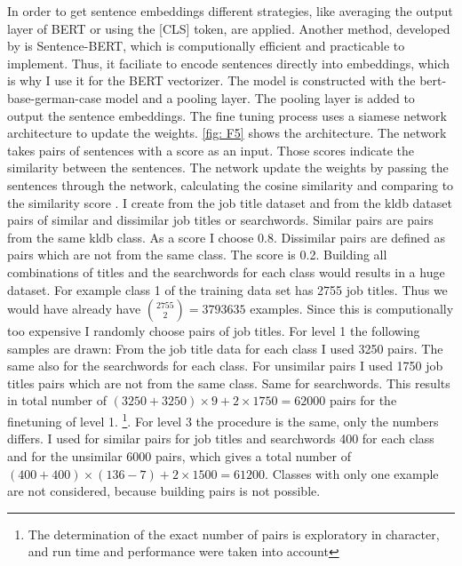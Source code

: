 \documentclass[12pt, a4paper, titlepage]{article}
\begin{document}
In order to get sentence embeddings different strategies, like averaging the output layer of \ac{BERT} or using the [CLS] token, are applied. Another method, developed by \citet{reimers2019} is Sentence-\ac{BERT}, which is computionally efficient and practicable to implement. Thus, it faciliate to encode sentences directly into embeddings, which is why I use it for the \ac{BERT} vectorizer. The model is constructed with the bert-base-german-case model and a pooling layer. The pooling layer is added to output the sentence embeddings. The fine tuning process uses a siamese network architecture to update the weights. \ref{fig: F5} shows the architecture. The network takes pairs of sentences with a score as an input. Those scores indicate the similarity between the sentences. The network update the weights by passing the sentences through the network, calculating the cosine similarity and comparing to the similarity score \citep{reimers2019}.
I create from the job title dataset and from the kldb dataset pairs of similar and dissimilar job titles or searchwords. Similar pairs are pairs from the same kldb class. As a score I choose 0.8. Dissimilar pairs are defined as pairs which are not from the same class. The score is 0.2. Building all combinations of titles and the searchwords for each class would results in a huge dataset. For example class 1 of the training data set has 2755 job titles. Thus we would have already have ${2755 \choose 2} = 3793635$ examples. Since this is computionally too expensive I randomly choose pairs of job titles. For level 1 the following samples are drawn: From the job title data for each class I used 3250 pairs. The same also for the searchwords for each class. For unsimilar pairs I used 1750 job titles pairs which are not from the same class. Same for searchwords. This results in total number of $(3250+3250) \times 9 + 2 \times 1750 = 62000$ pairs for the finetuning of level 1. \footnote{The determination of the exact number of pairs is exploratory in character, and run time and performance were taken into account}. For level 3 the procedure is the same, only the numbers differs. I used for similar pairs for job titles and searchwords 400 for each class and for the unsimilar 6000 pairs, which gives a total number of $(400 + 400) \times (136-7) + 2 \times 1500 =  61200$. Classes with only one example are not considered, because building pairs is not possible. 
\end{document}
